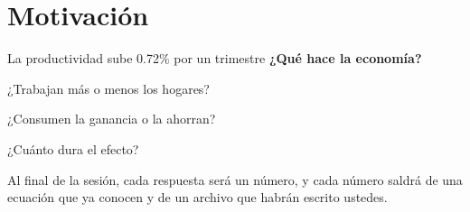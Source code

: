 \section{Motivación}

\begin{frame}[label=pregunta]{La productividad sube 0.72\% por un trimestre}
  \textbf{¿Qué hace la economía?}\par
  \vspace{0.45cm}
  ¿Trabajan más o menos los hogares?\par
  \vspace{0.15cm}
  ¿Consumen la ganancia o la ahorran?\par
  \vspace{0.15cm}
  ¿Cuánto dura el efecto?\par
  \vspace{0.6cm}
  Al final de la sesión, cada respuesta será un número, y cada número saldrá de una
  ecuación que ya conocen y de un archivo que habrán escrito ustedes.
\end{frame}

